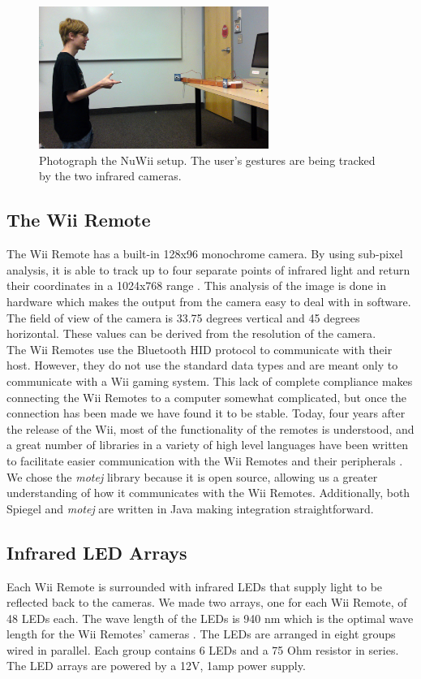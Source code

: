 \documentclass[a4paper,twoside]{article}
\begin{document}
\begin{figure}[h] \begin{center} \includegraphics[width = 7.5cm]{setup}
\end{center} \caption{Photograph the NuWii setup. The user's gestures are being
tracked by the two infrared cameras.} \label{setup} \end{figure}
 
\subsection{The Wii Remote} The Wii Remote has a built-in 128x96 monochrome
camera. By using sub-pixel analysis, it is able to track up to four separate
points of infrared light and return their coordinates in a 1024x768 range
\cite{WiiBrew10}. This analysis of the image is done in hardware which makes
the output from the camera easy to deal with in software. The field of view of
the camera is 33.75 degrees vertical and 45 degrees horizontal. These values
can be derived from the resolution of the camera\cite{Lee08}. \\

The Wii Remotes use the Bluetooth HID protocol to communicate with their host.
However, they do not use the standard data types and are meant only to
communicate with a Wii gaming system. This lack of complete compliance makes
connecting the Wii Remotes to a computer somewhat complicated, but once the
connection has been made we have found it to be stable. Today, four years after
the release of the Wii, most of the functionality of the remotes is understood,
and a great number of libraries in a variety of high level languages have been
written to facilitate easier communication with the Wii Remotes and their
peripherals \cite{WiiBrew10}. We chose the \emph{motej} library because it is
open source, allowing us a greater understanding of how it communicates with
the Wii Remotes.  Additionally, both Spiegel and \emph{motej} are written in
Java making integration straightforward.

\subsection{Infrared LED Arrays} Each Wii Remote is surrounded with infrared
LEDs that supply light to be reflected back to the cameras. We made two arrays,
one for each Wii Remote, of 48 LEDs each. The wave length of the LEDs is 940 nm
which is the optimal wave length for the Wii Remotes' cameras \cite{WiiBrew10}.
The LEDs are arranged in eight groups wired in parallel. Each group contains 6
LEDs and a 75 Ohm resistor in series. The LED arrays are powered by a 12V, 1amp
power supply.
 
\end{document}
